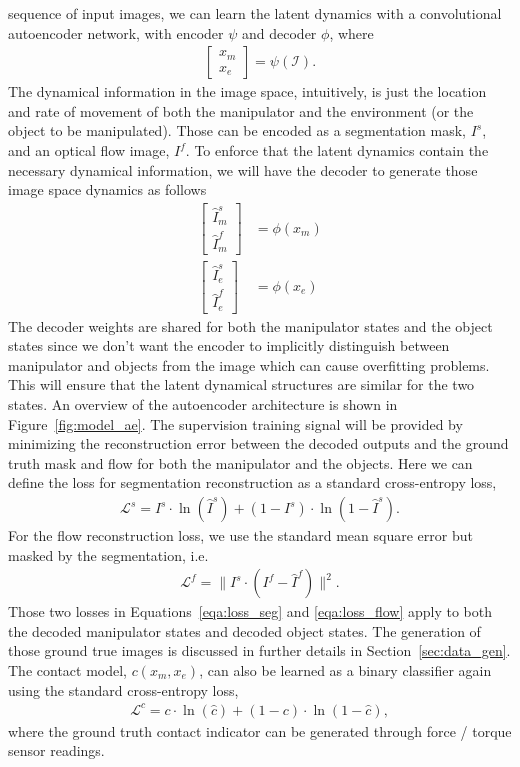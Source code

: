 \documentclass[conference]{IEEEtran}
\begin{document}
sequence of input images, we can learn the latent dynamics with a convolutional
autoencoder network, with encoder $\psi$ and decoder $\phi$, where
\begin{gather}
  \begin{bmatrix}x_m \\ x_e\end{bmatrix} = \psi(\mathcal{I}).
\end{gather}
The dynamical information in the image space, intuitively, is just the location
and rate of movement of both the manipulator and the environment (or the object
to be manipulated). Those can be encoded as a segmentation mask, $I^s$, and an optical
flow image, $I^f$. To enforce that the latent dynamics contain the necessary dynamical
information, we will have the decoder to generate those image space dynamics
as follows
\begin{equation}
  \begin{aligned}
    \begin{bmatrix}\hat{I}_m^s \\ \hat{I}_m^f\end{bmatrix} &= \phi(x_m) \\
    \begin{bmatrix}\hat{I}_e^s \\ \hat{I}_e^f\end{bmatrix} &= \phi(x_e)
  \end{aligned}
\end{equation}
The decoder weights are shared for both the manipulator states and the object states
since we don't want the encoder to implicitly distinguish between manipulator and
objects from the image which can cause overfitting problems. This will ensure
that the latent dynamical structures are similar for the two states.
An overview of the autoencoder architecture is shown in Figure~\ref{fig:model_ae}.
The supervision training signal will be provided by minimizing the reconstruction error
between the decoded outputs and the ground truth mask and flow for both the manipulator
and the objects. Here we can define the loss for segmentation reconstruction as a
standard cross-entropy loss,
\begin{gather}\label{eqa:loss_seg}
  \mathcal{L}^s = I^s \cdot \ln(\hat{I}^s) + (1 - I^s) \cdot \ln(1 - \hat{I}^s).
\end{gather}
For the flow reconstruction loss, we use the standard mean square error but
masked by the segmentation, i.e.
\begin{gather}\label{eqa:loss_flow}
  \mathcal{L}^f = \|I^s \cdot (I^f - \hat{I}^f)\|^2.
\end{gather}
Those two losses in Equations~\ref{eqa:loss_seg} and \ref{eqa:loss_flow} apply to
both the decoded manipulator states and decoded object states.
The generation of those ground true images is discussed in further
details in Section~\ref{sec:data_gen}.
The contact model, $c(x_m, x_e)$, can also be learned as a binary classifier
again using the standard cross-entropy loss,
\begin{gather}
  \mathcal{L}^c = c \cdot \ln(\hat{c}) + (1 - c) \cdot \ln(1 - \hat{c}),
\end{gather}
where the ground truth contact indicator can be generated through force / torque
sensor readings.
\end{document}
